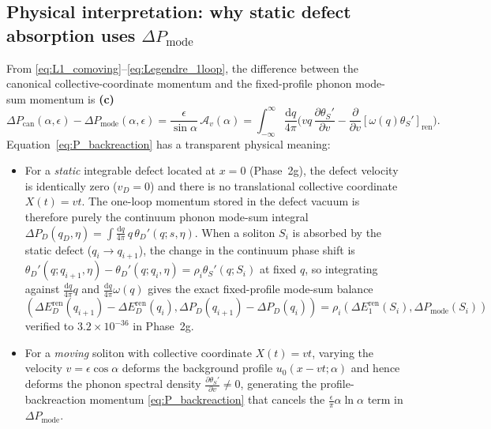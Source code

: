 \documentclass[11pt,a4paper]{article}
\newcommand{\dd}{\mathrm{d}}
\begin{document}
\subsection{Physical interpretation: why static defect absorption uses $\Delta P_{\mathrm{mode}}$}

From \eqref{eq:L1_comoving}--\eqref{eq:Legendre_1loop}, the difference between the
canonical collective-coordinate momentum and the fixed-profile phonon mode-sum
momentum is \textbf{(c)}
\begin{equation}
  \Delta P_{\mathrm{can}}(\alpha,\epsilon) - \Delta P_{\mathrm{mode}}(\alpha,\epsilon)
  = \frac{\epsilon}{\sin\alpha}\,\mathcal{A}_v(\alpha)
  = \int_{-\infty}^\infty \frac{\dd q}{4\pi}\Big(v q\,\frac{\partial\theta_S'}{\partial v}
    - \frac{\partial}{\partial v}[\omega(q)\theta_S']_{\mathrm{ren}}\Big).
  \label{eq:P_backreaction}
\end{equation}
Equation~\eqref{eq:P_backreaction} has a transparent physical meaning:
\begin{itemize}
\item For a \emph{static} integrable defect located at $x=0$ (Phase~2g), the
defect velocity is identically zero ($v_D = 0$) and there is no translational
collective coordinate $X(t) = vt$. The one-loop momentum stored in the defect
vacuum is therefore purely the continuum phonon mode-sum integral
$\Delta P_D(q_D,\eta) = \int \frac{\dd q}{4\pi}\,q\,\theta_D'(q;s,\eta)$. When a
soliton $S_i$ is absorbed by the static defect ($q_i \to q_{i+1}$), the change in
the continuum phase shift is $\theta_D'(q;q_{i+1},\eta) - \theta_D'(q;q_i,\eta) = \rho_i\theta_S'(q;S_i)$
at fixed $q$, so integrating against $\frac{\dd q}{4\pi}q$ and $\frac{\dd q}{4\pi}\omega(q)$
gives the exact fixed-profile mode-sum balance
$(\Delta E_D^{\mathrm{ren}}(q_{i+1})-\Delta E_D^{\mathrm{ren}}(q_i), \Delta P_D(q_{i+1})-\Delta P_D(q_i)) = \rho_i(\Delta E_1^{\mathrm{ren}}(S_i), \Delta P_{\mathrm{mode}}(S_i))$
verified to $3.2\times 10^{-36}$ in Phase~2g.
\item For a \emph{moving} soliton with collective coordinate $X(t) = vt$, varying
the velocity $v = \epsilon\cos\alpha$ deforms the background profile $u_0(x-vt;\alpha)$
and hence deforms the phonon spectral density $\frac{\partial\theta_S'}{\partial v} \neq 0$,
generating the profile-backreaction momentum \eqref{eq:P_backreaction} that
cancels the $\frac{\epsilon}{\pi}\alpha\ln\alpha$ term in $\Delta P_{\mathrm{mode}}$.
\end{itemize}

\end{document}
